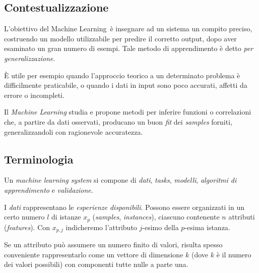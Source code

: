 
\def\ml{Machine Learning}


\subsection{Contestualizzazione}

L'obiettivo del \ml\ è insegnare ad un sistema un compito preciso, costruendo un modello utilizzabile per predire il corretto output, dopo aver esaminato un gran numero di esempi. Tale metodo di apprendimento è detto \emph{per generalizzazione}.

È utile per esempio quando l'approccio teorico a un determinato problema è difficilmente praticabile, o quando i dati in input sono poco accurati, affetti da errore o incompleti.

\begin{definition}
Il \emph{\ml} studia e propone metodi per inferire funzioni o correlazioni che, a partire da dati osservati, producano un buon \emph{fit} dei \emph{samples} forniti, generalizzandoli con ragionevole accuratezza.
\end{definition}

\subsection{Terminologia}

Un \emph{machine learning system} si compone di \emph{dati}, \emph{tasks}, \emph{modelli}, \emph{algoritmi di apprendimento} e \emph{validazione}.

\begin{definition}[Dati]
I \emph{dati} rappresentano le \emph{esperienze disponibili}. Possono essere organizzati in un certo numero $l$ di istanze $x_p$ (\emph{samples}, \emph{instances}), ciascuno contenente $n$ attributi (\emph{features}). Con $x_{p,j}$ indicheremo l'attributo $j$-esimo della $p$-esima istanza. 
\end{definition}


\begin{remark}
	Se un attributo può assumere un numero finito di valori, risulta spesso conveniente rappresentarlo come un vettore di dimensione $k$ (dove $k$ è il numero dei valori possibili) con componenti tutte nulle a parte una.
\end{remark}

